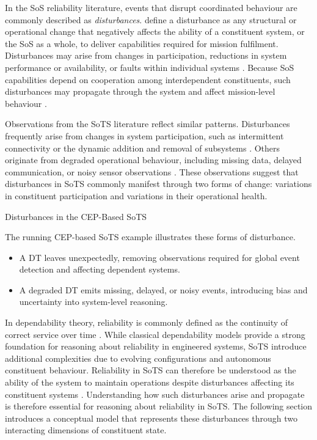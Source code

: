 In the SoS reliability literature, events that disrupt coordinated behaviour are commonly described as \emph{disturbances}. \citet{ferreira2023towards} define a disturbance as any structural or operational change that negatively affects the ability of a constituent system, or the SoS as a whole, to deliver capabilities required for mission fulfilment. Disturbances may arise from changes in participation, reductions in system performance or availability, or faults within individual systems \cite{ferreira2023towards}. Because SoS capabilities depend on cooperation among interdependent constituents, such disturbances may propagate through the system and affect mission-level behaviour \cite{avizienis2004basic,li2025reliability}.

Observations from the SoTS literature reflect similar patterns. Disturbances frequently arise from changes in system participation, such as intermittent connectivity or the dynamic addition and removal of subsystems \cite{parri2019jarvis,human2023design,howard2021greenhouse}. Others originate from degraded operational behaviour, including missing data, delayed communication, or noisy sensor observations \cite{esterle2021digital,gill2022method,chen2018digital,duan2023digital}. These observations suggest that disturbances in SoTS commonly manifest through two forms of change: variations in constituent participation and variations in their operational health.

\begin{runningexample}{Disturbances in the CEP-Based SoTS}

The running CEP-based SoTS example illustrates these forms of disturbance.

\begin{center}

\end{center}

\begin{itemize}[noitemsep]
\item A DT leaves unexpectedly, removing observations required for global event detection and affecting dependent systems.
\item A degraded DT emits missing, delayed, or noisy events, introducing bias and uncertainty into system-level reasoning.
\end{itemize}

\end{runningexample}

In dependability theory, reliability is commonly defined as the continuity of correct service over time \cite{avizienis2004basic}. While classical dependability models provide a strong foundation for reasoning about reliability in engineered systems, SoTS introduce additional complexities due to evolving configurations and autonomous constituent behaviour. Reliability in SoTS can therefore be understood as the ability of the system to maintain operations despite disturbances affecting its constituent systems \cite{ferreira2023towards}. Understanding how such disturbances arise and propagate is therefore essential for reasoning about reliability in SoTS. The following section introduces a conceptual model that represents these disturbances through two interacting dimensions of constituent state.


